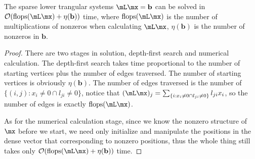 \begin{thm}
    \label{thm::sparseLxbcost}
    The sparse lower trangular systems $\mL\mx=\mathbf{b}$ can 
    be solved in $\mathcal{O}(\mathrm{flops}(\mL\mx)+
    \eta(\mathbf{b}))$ time, where $\mathrm{flops}(\mL\mx)$ is 
    the number of multiplications of nonzeros when calculating 
    $\mL\mx$, $\eta(\mathbf{b})$ is the number of nonzeros in 
    $\mathbf{b}$.
\end{thm}
\begin{proof}
    There are two stages in solution, depth-first search and 
    numerical calculation. The depth-first search takes time 
    proportional to the number of starting vertices plus the 
    number of edges traversed. The number of starting vertices 
    is obviously $\eta(\mathbf{b})$. The number of edges 
    traversed is the number of $\{(i,j):x_i\neq 0\cap 
    l_{ji}\neq 0\}$, notice that $(\mL\mx)_j=
    \sum_{\{i:x_i\neq 0\cap l_{ji}\neq 0\}}l_{ji}x_i$, so the 
    number of edges is exactly $\mathrm{flops}(\mL\mx)$. 

    As for the numerical calculation stage, since we know the 
    nonzero structure of $\mx$ before we start, we need only 
    initialize and manipulate the positions in the dense 
    vector that corresponding to nonzero positions, thus the 
    whole thing still takes only $\mathcal{O}(\mathrm{flops}
    (\mL\mx)+\eta(\mathbf{b}))$ time.
\end{proof}

